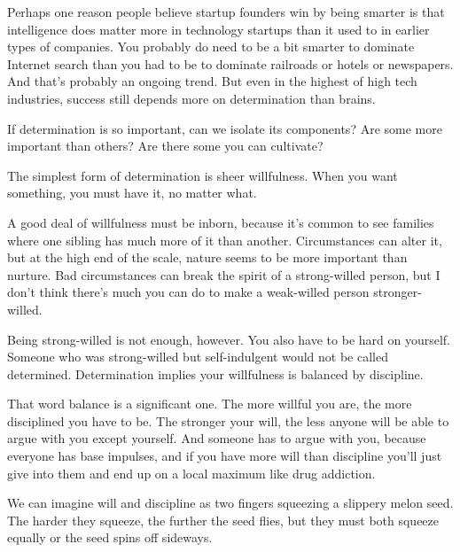 Perhaps one reason people
                    believe startup founders win by being smarter is that
                    intelligence does matter more in technology startups than it
                    used to in earlier types of companies. You probably do need
                    to be a bit smarter to dominate Internet search than you had
                    to be to dominate railroads or hotels or newspapers. And
                    that's probably an ongoing trend. But even in the highest of
                    high tech industries, success still depends more on
                    determination than brains.

If determination is so
                    important, can we isolate its components? Are some more
                    important than others? Are there some you can cultivate?

The
                    simplest form of determination is sheer willfulness. When
                    you want something, you must have it, no matter what.

A
                    good deal of willfulness must be inborn, because it's common
                    to see families where one sibling has much more of it than
                    another. Circumstances can alter it, but at the high end of
                    the scale, nature seems to be more important than nurture.
                    Bad circumstances can break the spirit of a strong-willed
                    person, but I don't think there's much you can do to make a
                    weak-willed person stronger-willed.

Being
                    strong-willed is not enough, however. You also have to be
                    hard on yourself. Someone who was strong-willed but
                    self-indulgent would not be called determined. Determination
                    implies your willfulness is balanced by discipline.

That
                    word balance is a significant one. The more willful you are,
                    the more disciplined you have to be. The stronger your will,
                    the less anyone will be able to argue with you except
                    yourself. And someone has to argue with you, because
                    everyone has base impulses, and if you have more will than
                    discipline you'll just give into them and end up on a local
                    maximum like drug addiction.

We can imagine will
                    and discipline as two fingers squeezing a slippery melon
                    seed. The harder they squeeze, the further the seed flies,
                    but they must both squeeze equally or the seed spins off
                    sideways.

